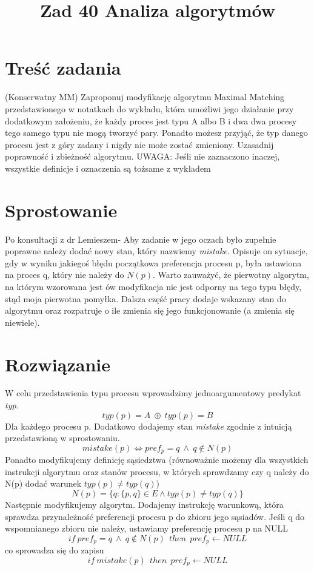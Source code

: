 \documentclass{article}
\title{Zad 40 Analiza algorytmów}
\begin{document}
\section{Treść zadania}
    (Konserwatny MM) Zaproponuj modyfikację algorytmu Maximal Matching 
    przedstawionego w notatkach do wykładu, która umożliwi jego działanie 
    przy dodatkowym założeniu, że każdy proces jest typu A albo B i dwa
    dwa procesy tego samego typu nie mogą tworzyć pary. Ponadto możesz
    przyjąć, że typ danego procesu jest z góry zadany i nigdy nie może 
    zostać zmieniony. Uzasadnij poprawność i zbieżność algorytmu.
    UWAGA: Jeśli nie zaznaczono inaczej, wszystkie definicje i oznaczenia 
    są tożsame z wykładem

\section{Sprostowanie}
    Po konsultacji z dr Lemieszem- Aby zadanie w jego oczach było zupełnie poprawne należy dodać nowy stan, który nazwiemy 
    \textit{mistake}. Opisuje on sytuacje, gdy w wyniku jakiegoś błędu początkowa preferencja procesu p, była ustawiona
    na proces q, który nie należy do $N(p)$. Warto zauważyć, że pierwotny algorytm, na którym wzorowana jest ów modyfikacja 
    nie jest odporny na tego typu błędy, stąd moja pierwotna pomyłka. Dalsza część pracy dodaje wskazany stan do algorytmu
    oraz rozpatruje o ile zmienia się jego funkcjonowanie (a zmienia się niewiele).
\section{Rozwiązanie}
    W celu przedstawienia typu procesu wprowadzimy jednoargumentowy predykat 
    \textit{typ}.
    \begin{equation}
        typ(p) = A \: \oplus \: typ(p) = B
    \end{equation}
    Dla każdego procesu p. Dodatkowo dodajemy stan \textit{mistake} zgodnie z intuicją przedstawioną w sprostowaniu. 
    \begin{equation}
        mistake(p) \iff pref_{p} = q \: \land \: q \notin N(p)
    \end{equation}
    Ponadto modyfikujemy definicję sąsiedztwa (równoważnie możemy dla wszystkich instrukcji algorytmu 
    oraz stanów procesu, w których sprawdzamy czy q należy do N(p)
    dodać warunek $typ(p) \neq typ(q)$)
    \begin{equation}
        N(p)=\{q:\{p,q\} \in E \land typ(p) \neq typ(q)\}
    \end{equation}
    Następnie modyfikujemy algorytm. Dodajemy instrukcję warunkową, która sprawdza przynależność preferencji procesu p 
    do zbioru jego sąsiadów. Jeśli q do wspomnianego zbioru nie należy, ustawiamy preferencję procesu p na NULL 
    \begin{equation}
        if \: pref_{p} = q \: \land \: q \notin N(p) \: \: then \: \: pref_{p} \leftarrow NULL
    \end{equation}
    co sprowadza się do zapisu
    \begin{equation}
        if \: mistake(p) \: \: then \: \: pref_{p} \leftarrow NULL
    \end{equation}
\end{document}
